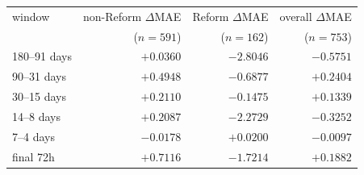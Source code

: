 \begin{tabular}{lrrr}
\toprule
window & non-Reform $\Delta$MAE & Reform $\Delta$MAE & overall $\Delta$MAE \\
       & ($n=591$) & ($n=162$) & ($n=753$) \\
\midrule
180--91 days & $+0.0360$ & $-2.8046$ & $-0.5751$ \\
90--31 days  & $+0.4948$ & $-0.6877$ & $+0.2404$ \\
30--15 days  & $+0.2110$ & $-0.1475$ & $+0.1339$ \\
14--8 days   & $+0.2087$ & $-2.2729$ & $-0.3252$ \\
7--4 days    & $-0.0178$ & $+0.0200$ & $-0.0097$ \\
final 72h    & $+0.7116$ & $-1.7214$ & $+0.1882$ \\
\bottomrule
\end{tabular}
